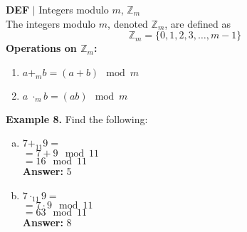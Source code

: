 \documentclass [12pt]{article}
\begin{document}
\vspace{5in}
\begin{framed}
\textbf{DEF} $|$ Integers modulo $m$, $\mathbb{Z}_m$\\
\vspace{0.5cm}
The integers modulo $m$, denoted $\mathbb{Z}_m$, are defined as
\[\mathbb{Z}_m = \{0,1, 2,3, \dots, m-1 \}\]
\textbf{Operations on $\mathbb{Z}_m$:}
\begin{enumerate}[]
\item $a +_{m} b = (a+b)\mod m$
\item $a \; \cdot_{m} b = (ab)\mod m$
\end{enumerate}
\end{framed}
\raggedright
\textbf{Example 8.} Find the following:
\begin{multicols}{2}
\begin{enumerate}[(a)]
\item $7 +_{11} 9 =$\\
\quad $=7+9\mod11$\\
\quad $=16\mod11$\\
\quad \textbf{Answer:} 5
\item $7 \cdot_{11} 9 =$\\
\quad $=7\cdot9\mod11$\\
\quad $=63\mod11$\\
\quad \textbf{Answer:} 8
\end{enumerate}
\end{multicols}
\end{document}
